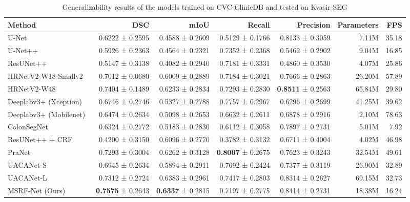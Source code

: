 \documentclass[journal,twoside,web]{IEEEtran}
\begin{document}
\begin{table*}[!t]
\centering
\scriptsize
\caption{Generalizability results of the models trained on CVC-ClinicDB and tested on Kvasir-SEG}
\label{tab:generalizationcvc}
\begin{tabular}{l|r|r|r|r|r|r}
\toprule
\textbf{Method} & \textbf{DSC} & \textbf{mIoU}& \textbf{Recall} & \textbf{Precision}& \textbf{Parameters} & \textbf{FPS}  \\ 
\hline
\hline
U-Net~\cite{ronneberger2015u} & 0.6222 ± 0.2595 & 0.4588 ± 0.2609 & 0.5129 ± 0.1766 & 0.8133 ± 0.3059 & 7.11M & 35.18\\ \hline

U-Net++~\cite{zhou2019unet++}  & 0.5926 ± 0.2363  & 0.4564 ± 0.2321 & 0.7352 ± 0.2368 & 0.5462 ± 0.2902  & 9.04M & 16.85      \\ \hline

ResUNet++~\cite{jha2019resunet++} & 0.5147 ± 0.3138 & 0.4082 ± 0.2940 & 0.7181 ± 0.3331 & 0.4860 ± 0.3530 & 4.07M & 25.86 \\ \hline

HRNetV2-W18-Smallv2~\cite{Wang_2020} & 0.7012 ± 0.0680 & 0.6009 ± 0.2889 & 0.7184 ± 0.3021 & 0.7666 ± 0.2863  & 26.20M & {57.89} \\ \hline 

HRNetV2-W48~\cite{Wang_2020} & 0.7404 ± 0.1489 & 0.6233 ± 0.2834 & 0.7293 ± 0.2830 & \textbf{0.8511} ± 0.2563 & 65.84M & 29.80\\ \hline

Deeplabv3+ (Xception)~\cite{chen2018encoder} & 0.6746 ± 0.2746 & 0.5327 ± 0.2788 & 0.7757 ± 0.2967 & 0.6296 ± 0.2699 & 41.25M & 39.62\\\hline

Deeplabv3+ (Mobilenet)~\cite{chen2018encoder} & 0.6474 ± 0.2634 & 0.5098 ± 0.2653 & 0.6632 ± 0.2611 & 0.6878 ± 0.2916 & 2.10M & 78.63\\ \hline

ColonSegNet~\cite{jha2021real} & 0.6324 ± 0.2772 & 0.5183 ± 0.2830 & 0.6112 ± 0.3058  & 0.7897 ± 0.2731 & 5.01M & 7.92 \\ \hline

ResUNet++ + CRF~\cite{jha2021comprehensive}& 0.4200 ± 0.3150 & 0.6096 ± 0.2770 & 0.3782 ± 0.3132 & 0.6711 ± 0.4004 & 4.02M & 46.98  \\ \hline

PraNet~\cite{fan2020pranet}  & 0.7293 ± 0.3004 & 0.6262 ± 0.3128 & \textbf{0.8007} ± 0.2675 & 0.7623 ± 0.3243 & 32.54M & 49.61  \\ \hline
UACANet-S~\cite{kim2021uacanet} & 0.6945 ± 0.2634 & 0.5894 ± 0.2911 & 0.7692 ± 0.2424 & 0.7377 ± 0.3119 & 26.90M & 32.89 \\ \hline
UACANet-L~\cite{kim2021uacanet}& 0.7312 ± 0.2724  & 0.6383 ± 0.2961 & 0.7417 ± 0.2803 & 0.8314 ± 0.2627 & 69.15M & 32.73 \\ \hline

MSRF-Net (Ours) &  \textbf{0.7575} ± 0.2643 & \textbf{0.6337} ± 0.2815 &0.7197 ± 0.2775 &0.8414 ± 0.2731 & 18.38M & 16.24\\ \hline   
\bottomrule
\end{tabular}
\vspace{-7mm}
\end{table*}
\end{document}
